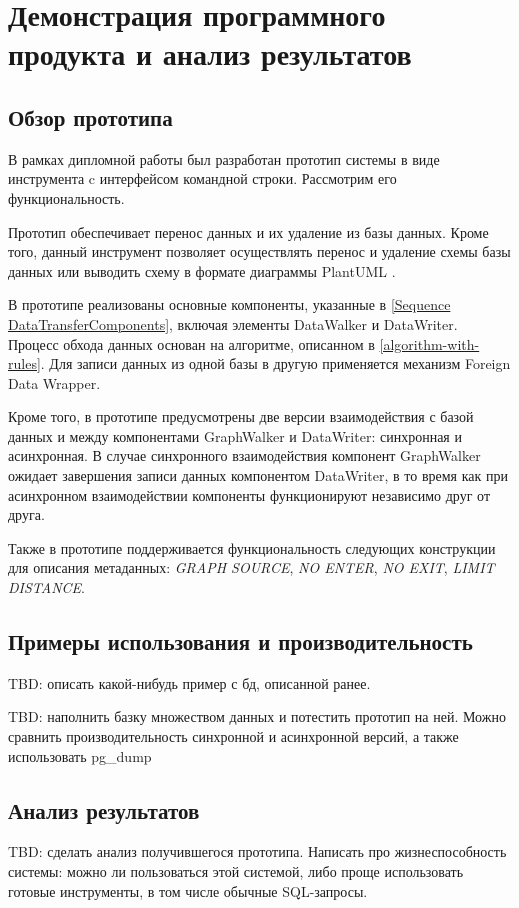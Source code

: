 \section{Демонстрация программного продукта и анализ результатов}

\subsection{Обзор прототипа}
В рамках дипломной работы был разработан прототип системы в виде инструмента c интерфейсом командной строки. Рассмотрим его функциональность.

Прототип обеспечивает перенос данных и их удаление из базы данных. Кроме того, данный инструмент позволяет осуществлять перенос и удаление схемы базы данных или выводить схему в формате диаграммы PlantUML \cite{plantuml}.

В прототипе реализованы основные компоненты, указанные в \ref{Sequence DataTransferComponents}, включая элементы DataWalker и DataWriter. Процесс обхода данных основан на алгоритме, описанном в \ref{algorithm-with-rules}. Для записи данных из одной базы в другую применяется механизм Foreign Data Wrapper.

Кроме того, в прототипе предусмотрены две версии взаимодействия с базой данных и между компонентами GraphWalker и DataWriter: синхронная и асинхронная. В случае синхронного взаимодействия компонент GraphWalker ожидает завершения записи данных компонентом DataWriter, в то время как при асинхронном взаимодействии компоненты функционируют независимо друг от друга.

Также в прототипе поддерживается функциональность следующих конструкции для описания метаданных: \textit{GRAPH SOURCE}, \textit{NO ENTER}, \textit{NO EXIT}, \textit{LIMIT DISTANCE}.

\subsection{Примеры использования и производительность}

TBD: описать какой-нибудь пример с бд, описанной ранее.

TBD: наполнить базку множеством данных и потестить прототип на ней. Можно сравнить производительность синхронной и асинхронной версий, а также использовать pg\_dump

\subsection{Анализ результатов}

TBD: сделать анализ получившегося прототипа. Написать про жизнеспособность системы: можно ли пользоваться этой системой, либо проще использовать готовые инструменты, в том числе обычные SQL-запросы.
